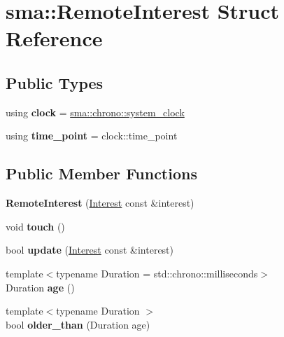 \hypertarget{structsma_1_1RemoteInterest}{\section{sma\-:\-:Remote\-Interest Struct Reference}
\label{structsma_1_1RemoteInterest}
}
\subsection*{Public Types}
\begin{DoxyCompactItemize}
\item 
\hypertarget{structsma_1_1RemoteInterest_a15f28d8b7d96cdb4fbea21287050e043}{using {\bfseries clock} = \hyperlink{structsma_1_1chrono_1_1system__clock}{sma\-::chrono\-::system\-\_\-clock}}\label{structsma_1_1RemoteInterest_a15f28d8b7d96cdb4fbea21287050e043}

\item 
\hypertarget{structsma_1_1RemoteInterest_aaa56fe0c17cfa18d9ae3b03eaeed6bea}{using {\bfseries time\-\_\-point} = clock\-::time\-\_\-point}\label{structsma_1_1RemoteInterest_aaa56fe0c17cfa18d9ae3b03eaeed6bea}

\end{DoxyCompactItemize}
\subsection*{Public Member Functions}
\begin{DoxyCompactItemize}
\item 
\hypertarget{structsma_1_1RemoteInterest_a93ddbc982387fa6c3e00103471683078}{{\bfseries Remote\-Interest} (\hyperlink{structsma_1_1Interest}{Interest} const \&interest)}\label{structsma_1_1RemoteInterest_a93ddbc982387fa6c3e00103471683078}

\item 
\hypertarget{structsma_1_1RemoteInterest_a6ee703fefb4d06f4eb2bd479c8d9b5c2}{void {\bfseries touch} ()}\label{structsma_1_1RemoteInterest_a6ee703fefb4d06f4eb2bd479c8d9b5c2}

\item 
\hypertarget{structsma_1_1RemoteInterest_a3467f2a1c1bfef70d58f871ac29e7d8d}{bool {\bfseries update} (\hyperlink{structsma_1_1Interest}{Interest} const \&interest)}\label{structsma_1_1RemoteInterest_a3467f2a1c1bfef70d58f871ac29e7d8d}

\item 
\hypertarget{structsma_1_1RemoteInterest_ab8467281e752ed0f53f4f0b819f32a53}{{\footnotesize template$<$typename Duration  = std\-::chrono\-::milliseconds$>$ }\\Duration {\bfseries age} ()}\label{structsma_1_1RemoteInterest_ab8467281e752ed0f53f4f0b819f32a53}

\item 
\hypertarget{structsma_1_1RemoteInterest_a4068855548cc83308e39bab529d9295e}{{\footnotesize template$<$typename Duration $>$ }\\bool {\bfseries older\-\_\-than} (Duration age)}\label{structsma_1_1RemoteInterest_a4068855548cc83308e39bab529d9295e}

\end{DoxyCompactItemize}
